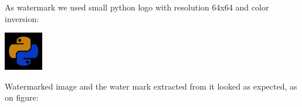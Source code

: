 \documentclass[a4paper, 12pt]{article}
\begin{document}
	\begin{figure}[!h]%
		\centering
		\qquad
		\label{}%
	\end{figure}	

     
    	
        As watermark we used small python logo with resolution 64x64 and color inversion:

        \begin{center}
            \includegraphics[scale=1.5]{watermark.png}
        \end{center}
    	
   	\newpage
        Watermarked image and the water mark extracted from it looked as expected, as on figure: %
        
\end{document}
